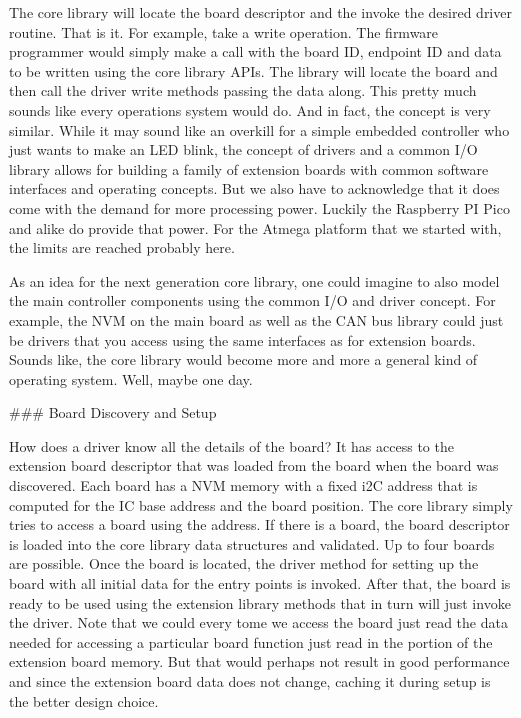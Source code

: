 The core library will locate the board descriptor and the invoke the desired driver routine. That is it. For example, take a write operation. The firmware programmer would simply make a call with the board ID, endpoint ID and data to be written using the core library APIs. The library will locate the board and then call the driver write methods passing the data along. This pretty much sounds like every operations system would do. And in fact, the concept is very similar. While it may sound like an overkill for a simple embedded controller who just wants to make an LED blink, the concept of drivers and a common I/O library allows for building a family of extension boards with common software interfaces and operating concepts. But we also have to acknowledge that it does come with the demand for more processing power. Luckily the Raspberry PI Pico and alike do provide that power. For the Atmega platform that we started with, the limits are reached probably here.

As an idea for the next generation core library, one could imagine to also model the main controller components using the common I/O and driver concept. For example, the NVM on the main board as well as the CAN bus library could just be drivers that you access using the same interfaces as for extension boards. Sounds like, the core library would become more and more a general kind of operating system. Well, maybe one day.

### Board Discovery and Setup

How does a driver know all the details of the board? It has access to the extension board descriptor that was loaded from the board when the board was discovered. Each board has a NVM memory with a fixed i2C address that is computed for the IC base address and the board position. The core library simply tries to access a board using the address. If there is a board, the board descriptor is loaded into the core library data structures and validated. Up to four boards are possible. Once the board is located, the driver method for setting up the board with all initial data for the entry points is invoked. After that, the board is ready to be used using the extension library methods that in turn will just invoke the driver. Note that we could every tome we access the board just read the data needed for accessing a particular board function just read in the portion of the extension board memory. But that would perhaps not result in good performance and since the extension board data does not change, caching it during setup is the better design choice.

